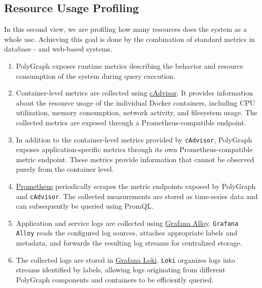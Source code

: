 \documentclass[11pt,a4paper]{article}
\begin{document}
\subsection{Resource Usage Profiling}

In this second view, we are profiling how many resources does the system as a whole use. Achieving this goal is done by the combination of standard metrics in database - and web-based systems.

\begin{enumerate}
    \item PolyGraph exposes runtime metrics describing the behavior and resource
    consumption of the system during query execution.

    \item Container-level metrics are collected using
    \href{https://github.com/google/cadvisor}{cAdvisor}. It provides information
    about the resource usage of the individual Docker containers, including CPU
    utilization, memory consumption, network activity, and filesystem usage.
    The collected metrics are exposed through a Prometheus-compatible endpoint.

    \item In addition to the container-level metrics provided by
    \texttt{cAdvisor}, PolyGraph exposes application-specific metrics through
    its own Prometheus-compatible metric endpoint. These metrics provide
    information that cannot be observed purely from the container level.

    \item \href{https://prometheus.io/}{Prometheus} periodically scrapes the
    metric endpoints exposed by PolyGraph and \texttt{cAdvisor}. The collected
    measurements are stored as time-series data and can subsequently be queried
    using PromQL.

    \item Application and service logs are collected using
    \href{https://grafana.com/docs/alloy/latest/}{Grafana Alloy}.
    \texttt{Grafana Alloy} reads the configured log sources, attaches
    appropriate labels and metadata, and forwards the resulting log streams
    for centralized storage.

    \item The collected logs are stored in
    \href{https://grafana.com/oss/loki/}{Grafana Loki}. \texttt{Loki} organizes
    logs into streams identified by labels, allowing logs originating from
    different PolyGraph components and containers to be efficiently queried.


\end{enumerate}
\end{document}
